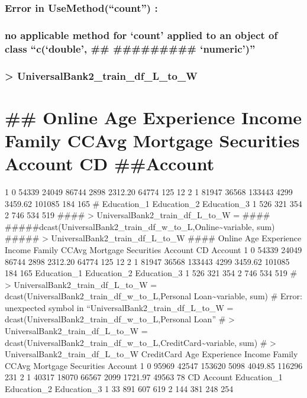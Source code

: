 \documentclass[
]{article}
\begin{document}
\hypertarget{error-in-usemethodcount}{%
\subsubsection{Error in UseMethod(``count'')
:}\label{error-in-usemethodcount}}

\hypertarget{no-applicable-method-for-count-applied-to-an-object-of-class-cdouble-numeric}{%
\subsubsection{no applicable method for `count' applied to an object of
class ``c(`double', \#\# \#\#\#\#\#\#\#\#\#
`numeric')''}\label{no-applicable-method-for-count-applied-to-an-object-of-class-cdouble-numeric}}

\hypertarget{universalbank2_train_df_l_to_w-1}{%
\subsubsection{\textgreater{}
UniversalBank2\_train\_df\_L\_to\_W}\label{universalbank2_train_df_l_to_w-1}}

\hypertarget{online-age-experience-income-family-ccavg-mortgage-securities-account-cd-account}{%
\section{\#\# Online Age Experience Income Family CCAvg Mortgage
Securities Account CD
\#\#Account}\label{online-age-experience-income-family-ccavg-mortgage-securities-account-cd-account}}

1 0 54339 24049 86744 2898 2312.20 64774 125 12 2 1 81947 36568 133443
4299 3459.62 101085 184 165 \# Education\_1 Education\_2 Education\_3 1
526 321 354 2 746 534 519 \#\#\#\# \textgreater{}
UniversalBank2\_train\_df\_L\_to\_W = \#\#\#\#
\#\#\#\#\#dcast(UniversalBank2\_train\_df\_w\_to\_L,Online\textasciitilde variable,
sum) \#\#\#\#\# \textgreater{} UniversalBank2\_train\_df\_L\_to\_W
\#\#\#\# Online Age Experience Income Family CCAvg Mortgage Securities
Account CD Account 1 0 54339 24049 86744 2898 2312.20 64774 125 12 2 1
81947 36568 133443 4299 3459.62 101085 184 165 Education\_1 Education\_2
Education\_3 1 526 321 354 2 746 534 519 \# \textgreater{}
UniversalBank2\_train\_df\_L\_to\_W =
dcast(UniversalBank2\_train\_df\_w\_to\_L,Personal
Loan\textasciitilde variable, sum) \# Error: unexpected symbol in
``UniversalBank2\_train\_df\_L\_to\_W =
dcast(UniversalBank2\_train\_df\_w\_to\_L,Personal Loan'' \#
\textgreater{} UniversalBank2\_train\_df\_L\_to\_W =
dcast(UniversalBank2\_train\_df\_w\_to\_L,CreditCard\textasciitilde variable,
sum) \# \textgreater{} UniversalBank2\_train\_df\_L\_to\_W CreditCard
Age Experience Income Family CCAvg Mortgage Securities Account 1 0 95969
42547 153620 5098 4049.85 116296 231 2 1 40317 18070 66567 2099 1721.97
49563 78 CD Account Education\_1 Education\_2 Education\_3 1 33 891 607
619 2 144 381 248 254
\end{document}
